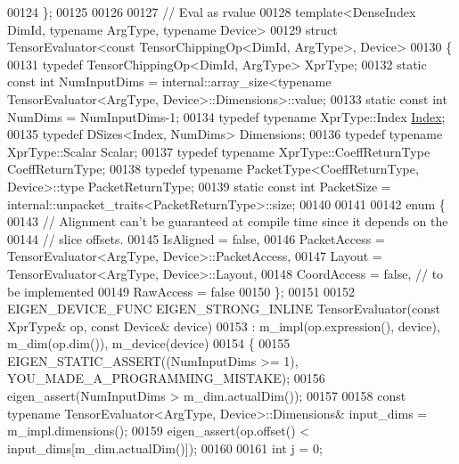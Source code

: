 \begin{DoxyCode}
00124 \};
00125 
00126 
00127 \textcolor{comment}{// Eval as rvalue}
00128 \textcolor{keyword}{template}<DenseIndex DimId, \textcolor{keyword}{typename} ArgType, \textcolor{keyword}{typename} Device>
00129 \textcolor{keyword}{struct }TensorEvaluator<const TensorChippingOp<DimId, ArgType>, Device>
00130 \{
00131   \textcolor{keyword}{typedef} TensorChippingOp<DimId, ArgType> XprType;
00132   \textcolor{keyword}{static} \textcolor{keyword}{const} \textcolor{keywordtype}{int} NumInputDims = internal::array\_size<typename TensorEvaluator<ArgType,
       Device>::Dimensions>::value;
00133   \textcolor{keyword}{static} \textcolor{keyword}{const} \textcolor{keywordtype}{int} NumDims = NumInputDims-1;
00134   \textcolor{keyword}{typedef} \textcolor{keyword}{typename} XprType::Index \hyperlink{namespace_eigen_a62e77e0933482dafde8fe197d9a2cfde}{Index};
00135   \textcolor{keyword}{typedef} DSizes<Index, NumDims> Dimensions;
00136   \textcolor{keyword}{typedef} \textcolor{keyword}{typename} XprType::Scalar Scalar;
00137   \textcolor{keyword}{typedef} \textcolor{keyword}{typename} XprType::CoeffReturnType CoeffReturnType;
00138   \textcolor{keyword}{typedef} \textcolor{keyword}{typename} PacketType<CoeffReturnType, Device>::type PacketReturnType;
00139   \textcolor{keyword}{static} \textcolor{keyword}{const} \textcolor{keywordtype}{int} PacketSize = internal::unpacket\_traits<PacketReturnType>::size;
00140 
00141 
00142   \textcolor{keyword}{enum} \{
00143     \textcolor{comment}{// Alignment can't be guaranteed at compile time since it depends on the}
00144     \textcolor{comment}{// slice offsets.}
00145     IsAligned = \textcolor{keyword}{false},
00146     PacketAccess = TensorEvaluator<ArgType, Device>::PacketAccess,
00147     Layout = TensorEvaluator<ArgType, Device>::Layout,
00148     CoordAccess = \textcolor{keyword}{false},  \textcolor{comment}{// to be implemented}
00149     RawAccess = \textcolor{keyword}{false}
00150   \};
00151 
00152   EIGEN\_DEVICE\_FUNC EIGEN\_STRONG\_INLINE TensorEvaluator(\textcolor{keyword}{const} XprType& op, \textcolor{keyword}{const} Device& device)
00153       : m\_impl(op.expression(), device), m\_dim(op.dim()), m\_device(device)
00154   \{
00155     EIGEN\_STATIC\_ASSERT((NumInputDims >= 1), YOU\_MADE\_A\_PROGRAMMING\_MISTAKE);
00156     eigen\_assert(NumInputDims > m\_dim.actualDim());
00157 
00158     \textcolor{keyword}{const} \textcolor{keyword}{typename} TensorEvaluator<ArgType, Device>::Dimensions& input\_dims = m\_impl.dimensions();
00159     eigen\_assert(op.offset() < input\_dims[m\_dim.actualDim()]);
00160 
00161     \textcolor{keywordtype}{int} j = 0;

\end{DoxyCode}
